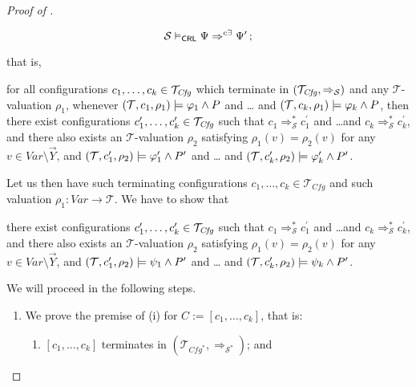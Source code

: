 \begin{proof}[Proof of ]
\begin{enumerate}
\begin{proofenv}
        \begin{equation*}
            \mathcal{S} \vDash_{\mathsf{CRL}} \Psi \Rightarrow^{c\exists} \Psi^\prime \, ;
        \end{equation*}
    \end{proofenv}
    that is,
    \begin{proofenv}
        for all configurations $c_1,\ldots,c_k \in \mathcal{T}_{\mathit{Cfg}}$
        which terminate in $(\mathcal{T}_{\mathit{Cfg}}, \Rightarrow_{\mathcal{S}})$
        and any $\mathcal{T}$-valuation $\rho_1$,
        whenever $(\mathcal{T}, c_1,\rho_1) \models \varphi_1 \land P$ and \ldots
        and $(\mathcal{T}, c_k,\rho_1) \models \varphi_k \land P$,
        then there exist configurations $c_1^\prime,\ldots,c_k^\prime \in \mathcal{T}_{\mathit{Cfg}}$
        such that $c_1 \Rightarrow^{*}_{\mathcal{S}} c_1^\prime$
        and \ldots and $c_k \Rightarrow^{*}_{\mathcal{S}} c_k^\prime$,
        and there also exists an $\mathcal{T}$-valuation $\rho_2$
        satisfying $\rho_1(v) = \rho_2(v)$ for any $v \in \mathit{Var} \setminus \vec{Y}$,
        and
        $(\mathcal{T}, c_1^\prime,\rho_2) \models \varphi^\prime_1 \land P^\prime$ and \ldots
        and $(\mathcal{T}, c_k^\prime, \rho_2) \models \varphi^\prime_k \land P^\prime$.
    \end{proofenv}
    Let us then have such terminating configurations $c_1,\ldots,c_k \in \mathcal{T}_{\mathit{Cfg}}$
    and such valuation $\rho_1 : \mathit{Var} \to \mathcal{T}$.
    We have to show that
    \begin{proofenv}
        there exist configurations $c_1^\prime,\ldots,c_k^\prime \in \mathcal{T}_{\mathit{Cfg}}$
        such that $c_1 \Rightarrow^{*}_{\mathcal{S}} c_1^\prime$
        and \ldots and $c_k \Rightarrow^{*}_{\mathcal{S}} c_k^\prime$,
        and there also exists an $\mathcal{T}$-valuation $\rho_2$
        satisfying $\rho_1(v) = \rho_2(v)$ for any $v \in \mathit{Var} \setminus \vec{Y}$,
        and
        $(\mathcal{T}, c_1^\prime,\rho_2) \models \psi_1 \land P^\prime$ and \ldots
        and $(\mathcal{T}, c_k^\prime, \rho_2) \models \psi_k \land P^\prime$.
    \end{proofenv}
    We will proceed in the following steps.
    \begin{enumerate}
        \item We prove the premise of (i) for $C := [c_1,\ldots,c_k]$, that is:
        \begin{enumerate}
            \item $[c_1,\ldots,c_k]$ terminates in $(\mathcal{T}_{\mathit{Cfg}^*}, \Rightarrow_{\mathcal{S}^*})$; and

\end{enumerate}
\end{enumerate}
\end{enumerate}
\end{proof}
